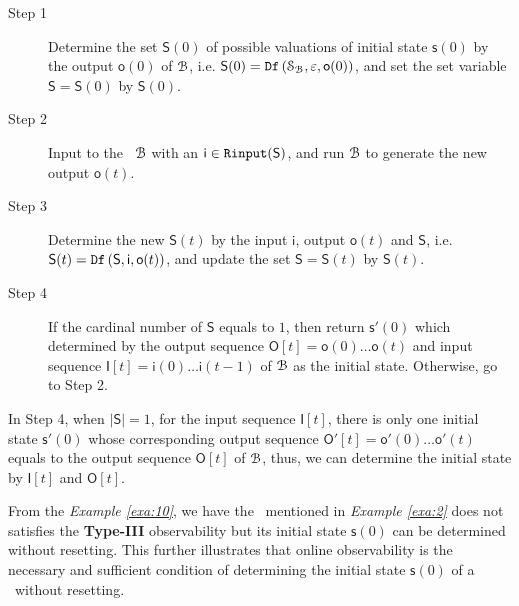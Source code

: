 \begin{description}
	\item[Step 1]  Determine the set $\mathsf{S}(0)$ of possible valuations of initial state $\mathsf{s}(0)$ by the output $\mathsf{o}(0)$ of ${\mathcal{B}}$, i.e. $\mathsf{S}(0)={\tt Df}\left(\mathcal{S}_{\mathcal{B}},\varepsilon,\mathsf{o}(0)\right)$, and set the set variable $\mathsf{S}=\mathsf{S}(0)$ by $\mathsf{S}(0)$.
	\item[Step 2] Input to the \BCN\ ${\mathcal{B}}$ with an $\mathsf{i}\in{\tt Rinput}(\mathsf{S})$, and run ${\mathcal{B}}$ to generate the new output $\mathsf{o}(t)$. 
	\item[Step 3] Determine the new $\mathsf{S}(t)$ by the input $\mathsf{i}$, output $\mathsf{o}(t)$ and $\mathsf{S}$, i.e. $\mathsf{S}(t)={\tt Df}\left(\mathsf{S},\mathsf{i},\mathsf{o}(t)\right)$, and update the set $\mathsf{S}=\mathsf{S}(t)$ by $\mathsf{S}(t)$.
	\item[Step 4] If the cardinal number of $\mathsf{S}$ equals to $1$, then return $\mathsf{s}'(0)$ which determined by the output sequence $\mathsf{O}[t]=\mathsf{o}(0)\ldots\mathsf{o}(t)$ and input sequence $\mathsf{I}[t]=\mathsf{i}(0)\ldots\mathsf{i}(t-1)$ of ${\mathcal{B}}$ as the initial state. %
	 Otherwise, go to Step 2.
\end{description}
  In Step 4, when $|\mathsf{S}|=1$, for the input sequence $\mathsf{I}[t]$, there is only one initial state $\mathsf{s}'(0)$ whose corresponding output sequence  $\mathsf{O}'[t]=\mathsf{o}'(0)\ldots\mathsf{o}'(t)$ equals to the output sequence $\mathsf{O}[t]$ of ${\mathcal{B}}$, thus, we can determine the initial state by $\mathsf{I}[t]$ and $\mathsf{O}[t]$. 

 From the {\em Example \ref{exa:10}}, we have the \BCN\ mentioned in {\em Example \ref{exa:2}} does not satisfies the {\bf Type-III} observability but its initial state $\mathsf{s}(0)$  can be determined without resetting. 
 This further illustrates that online observability is the necessary and sufficient condition of determining the initial state $\mathsf{s}(0)$ of a \BCN\  without  resetting.


